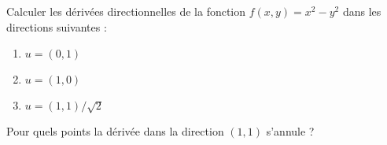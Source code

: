 
\begin{exercice}\label{exoOutilsMath-0041}

    Calculer les dérivées directionnelles de la fonction $f(x,y)=x^2-y^2$ dans les directions suivantes :
    \begin{enumerate}
        \item
            $u=(0,1)$
        \item
            $u=(1,0)$
        \item
            $u=(1,1)/\sqrt{2}$
    \end{enumerate}
    Pour quels points la dérivée dans la direction $(1,1)$ s'annule ?

\end{exercice}
